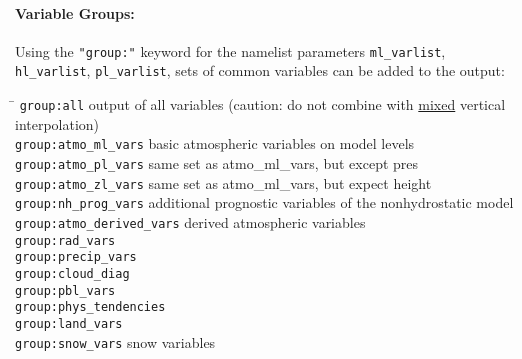 \paragraph{Variable Groups:}
Using the \texttt{"group:"} keyword for the namelist parameters \texttt{ml\_varlist}, \texttt{hl\_varlist}, \texttt{pl\_varlist},
sets of common variables can be added to the output:
\begin{tabbing}
\hspace*{0.4\textwidth} \= \kill
\texttt{group:all}                     \>      output of all variables (caution: do not combine with \underline{mixed} vertical interpolation) \\
\texttt{group:atmo\_ml\_vars}          \>      basic atmospheric variables on model levels                          \\
\texttt{group:atmo\_pl\_vars}          \>      same set as atmo\_ml\_vars, but except pres\\
\texttt{group:atmo\_zl\_vars}          \>      same set as atmo\_ml\_vars, but expect height\\
\texttt{group:nh\_prog\_vars}          \>      additional prognostic variables of the nonhydrostatic model          \\
\texttt{group:atmo\_derived\_vars}     \>      derived atmospheric variables                                        \\
\texttt{group:rad\_vars}               \>                                                                           \\
\texttt{group:precip\_vars}            \>                                                                           \\
\texttt{group:cloud\_diag}             \>                                                                           \\
\texttt{group:pbl\_vars}               \>                                                                           \\
\texttt{group:phys\_tendencies}        \>                                                                           \\
\texttt{group:land\_vars}              \>                                                                           \\
\texttt{group:snow\_vars}              \>     snow variables                                                        \\

\end{tabbing}
